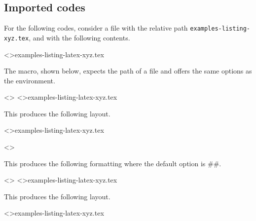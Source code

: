 \subsection{Imported codes}

For the following codes, consider a file with the relative path \verb+examples-listing-xyz.tex+, and with the following contents.

\tdoclatexinput<>{examples-listing-latex-xyz.tex}

\medskip

The  macro, shown below, expects the path of a file and offers the same options as the  environment.




\begin{tdocexa}
    \leavevmode

    \begin{tdoclatex}<>
\tdoclatexinput<>{examples-listing-latex-xyz.tex}
    \end{tdoclatex}

    This produces the following layout.

    \tdoclatexinput<>{examples-listing-latex-xyz.tex}
\end{tdocexa}




\begin{tdocexa}[Following]
    \leavevmode

    \begin{tdoclatex}<>

    \end{tdoclatex}

    This produces the following formatting where the default option is \tdoclatexin##.


\end{tdocexa}




\begin{tdocexa}
    \leavevmode

    \begin{tdoclatex}<>
\tdoclatexinput<>{examples-listing-latex-xyz.tex}
    \end{tdoclatex}

    This produces the following layout.

    \tdoclatexinput<>{examples-listing-latex-xyz.tex}
\end{tdocexa}



